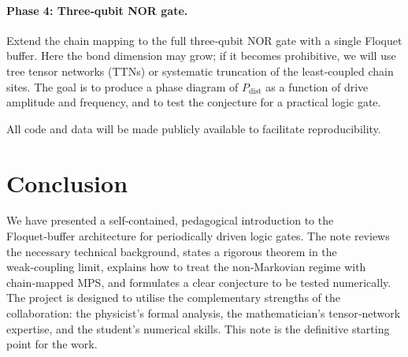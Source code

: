 \documentclass[11pt,a4paper]{article}
\theoremstyle{plain}
\theoremstyle{definition}
\theoremstyle{remark}
\begin{document}
\paragraph{Phase 4: Three‑qubit NOR gate.}
Extend the chain mapping to the full three‑qubit NOR gate with a single Floquet buffer. Here the bond dimension may grow; if it becomes prohibitive, we will use tree tensor networks (TTNs) or systematic truncation of the least‑coupled chain sites. The goal is to produce a phase diagram of $P_{\text{dist}}$ as a function of drive amplitude and frequency, and to test the conjecture for a practical logic gate.

All code and data will be made publicly available to facilitate reproducibility.

\section{Conclusion}
We have presented a self‑contained, pedagogical introduction to the Floquet‑buffer architecture for periodically driven logic gates. The note reviews the necessary technical background, states a rigorous theorem in the weak‑coupling limit, explains how to treat the non‑Markovian regime with chain‑mapped MPS, and formulates a clear conjecture to be tested numerically. The project is designed to utilise the complementary strengths of the collaboration: the physicist’s formal analysis, the mathematician’s tensor‑network expertise, and the student’s numerical skills. This note is the definitive starting point for the work.
\end{document}
